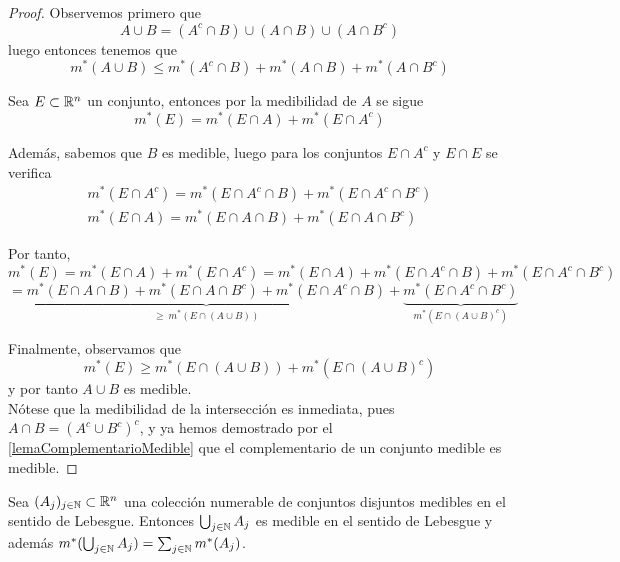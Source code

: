 \begin{proof}
    Observemos primero que
    \[
        A \cup B = (A^c \cap B) \cup (A \cap B) \cup (A \cap B^c)
    \]
    luego entonces tenemos que
    \[
        m^*(A \cup B) \leq m^*(A^c \cap B) + m^*(A \cap B) + m^*(A \cap B^c)
    \]

    Sea \( E \subset \mathbb{R}^n \) un conjunto, entonces por la medibilidad de \( A \)
    se sigue
    \[
        m^*(E) = m^*(E \cap A) + m^*(E \cap A^c)
    \]

    Además, sabemos que \( B \) es medible, luego para los conjuntos \( E \cap A^c
    \) y \(E \cap E\) se verifica
    \[
        \begin{matrix}
            m^*(E \cap A^c) = m^*(E \cap A^c \cap B) + m^*(E \cap A^c \cap B^c) \\
            m^*(E \cap A) = m^*(E \cap A \cap B) + m^*(E \cap A \cap B^c)
        \end{matrix}
    \]

    Por tanto,
    \[
        m^*(E) = m^*(E \cap A) + m^*(E \cap A^c) = m^*(E \cap A) + m^*(E \cap A^c \cap B) + m^*(E \cap A^c \cap B^c)
    \]
    \[
        = \underbrace{m^*(E \cap A \cap B) + m^*(E \cap A \cap B^c) + m^*(E \cap A^c \cap B)}_{\geq \ m^*(E \cap (A \cup B))} + \underbrace{m^*(E \cap A^c \cap B^c)}_{m^*(E \cap (A \cup B)^c)}
    \]

    Finalmente, observamos que
    \[
        m^*(E) \geq m^*(E \cap (A \cup B)) + m^*(E \cap (A \cup B)^c)
    \]
    y por tanto \( A \cup B \) es medible.\\ Nótese que la medibilidad de la
    intersección es inmediata, pues \( A \cap B = (A^c \cup B^c)^c \), y ya hemos
    demostrado por el \cref{lemaComplementarioMedible} que el complementario de un conjunto medible es medible.
\end{proof}

\begin{lema}
    Sea $(A_j)_{j \in \mathbb{N}} \subset \mathbb{R}^n$ una colección numerable de conjuntos disjuntos medibles en el sentido de Lebesgue. Entonces $\bigcup_{j \in \mathbb{N}} A_j$ es medible en el sentido de Lebesgue y además $m^*(\bigcup_{j \in \mathbb{N}} A_j) = \sum_{j \in \mathbb{N}} m^*(A_j)$.
    \label{unionNumerableMedible}
\end{lema}

